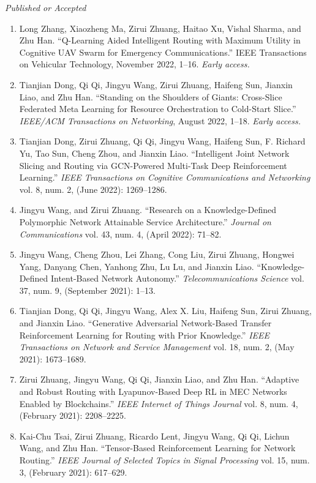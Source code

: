 \documentclass[letterpaper,11pt]{article}
\newcommand{\contentlength}{5.25in} %
\begin{document}
\begin{tcolorbox}[flush right,breakable,colback=white,colframe=white,width=\contentlength]
		\textit{Published or Accepted}
		\begin{enumerate}[itemsep=0mm]
			\item Long Zhang, Xiaozheng Ma, Zirui Zhuang, Haitao Xu, Vishal Sharma, and Zhu Han. “Q-Learning Aided Intelligent Routing with Maximum Utility in Cognitive UAV Swarm for Emergency Communications.” IEEE Transactions on Vehicular Technology, November 2022, 1–16. \textit{Early access.}
			\item Tianjian Dong, Qi Qi, Jingyu Wang, Zirui Zhuang, Haifeng Sun, Jianxin Liao, and Zhu Han. “Standing on the Shoulders of Giants: Cross-Slice Federated Meta Learning for Resource Orchestration to Cold-Start Slice.” \textit{IEEE/ACM Transactions on Networking}, August 2022, 1–18. \textit{Early access.}
			\item Tianjian Dong, Zirui Zhuang, Qi Qi, Jingyu Wang, Haifeng Sun, F. Richard Yu, Tao Sun, Cheng Zhou, and Jianxin Liao. “Intelligent Joint Network Slicing and Routing via GCN-Powered Multi-Task Deep Reinforcement Learning.” \textit{IEEE Transactions on Cognitive Communications and Networking} vol. 8, num. 2, (June 2022): 1269–1286.
			\item Jingyu Wang, and Zirui Zhuang. “Research on a Knowledge-Defined Polymorphic Network Attainable Service Architecture.” \textit{Journal on Communications} vol. 43, num. 4, (April 2022): 71–82.
			\item Jingyu Wang, Cheng Zhou, Lei Zhang, Cong Liu, Zirui Zhuang, Hongwei Yang, Danyang Chen, Yanhong Zhu, Lu Lu, and Jianxin Liao. “Knowledge-Defined Intent-Based Network Autonomy.” \textit{Telecommunications Science} vol. 37, num. 9, (September 2021): 1–13.
			\item Tianjian Dong, Qi Qi, Jingyu Wang, Alex X. Liu, Haifeng Sun, Zirui Zhuang, and Jianxin Liao. “Generative Adversarial Network-Based Transfer Reinforcement Learning for Routing with Prior Knowledge.” \textit{IEEE Transactions on Network and Service Management} vol. 18, num. 2, (May 2021): 1673–1689.
			\item Zirui Zhuang, Jingyu Wang, Qi Qi, Jianxin Liao, and Zhu Han. “Adaptive and Robust Routing with Lyapunov-Based Deep RL in MEC Networks Enabled by Blockchains.” \textit{IEEE Internet of Things Journal} vol. 8, num. 4, (February 2021): 2208–2225.
			\item Kai-Chu Tsai, Zirui Zhuang, Ricardo Lent, Jingyu Wang, Qi Qi, Lichun Wang, and Zhu Han. “Tensor-Based Reinforcement Learning for Network Routing.” \textit{IEEE Journal of Selected Topics in Signal Processing} vol. 15, num. 3, (February 2021): 617–629.

\end{enumerate}
\end{tcolorbox}
\end{document}
